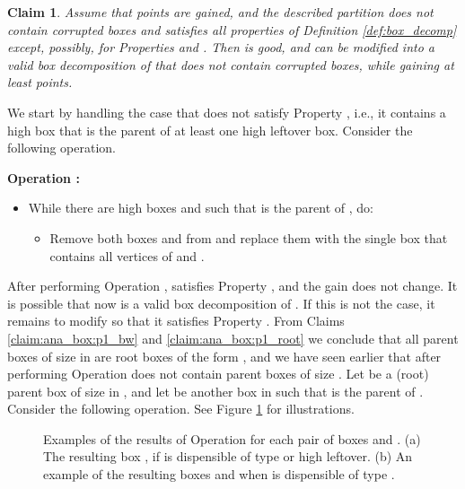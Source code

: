 \documentclass[11pt]{article}
\def\Proof{\par\noindent{\bf Proof:~}}
\def\dnsitem{\vspace{-7pt}\item}
\newtheorem{claim}[theorem]{Claim}
\theoremstyle{definition}
\begin{document}
\begin{claim}
\label{claim:ana_box:fix_p}
Assume that  points are gained, and the described partition  
does not contain corrupted boxes and satisfies all properties of Definition \ref{def:box_decomp} except, possibly, for Properties  and .
Then  is good, and  can be modified into a valid box decomposition of  that does not contain corrupted boxes, while gaining at least  points.
\end{claim}
\Proof
We start by handling the case that  does not satisfy Property , i.e., it contains a high box that is the parent of at least one high leftover box.
Consider the following operation.
\smallskip
\par\noindent
{\bf Operation :}
\begin{itemize}
\dnsitem[] While there are high boxes  and  such that  is the parent of , do:
	\begin{itemize}
		\dnsitem[] Remove both boxes  and  from  and replace them with the single box  that contains all vertices of  and .
	\end{itemize}
\end{itemize}
\bigskip
After performing Operation ,  satisfies Property , and the gain does not change.
It is possible that now  is a valid box decomposition of .
If this is not the case, it remains to modify  so that it satisfies Property .
From Claims \ref{claim:ana_box:p1_bw} and \ref{claim:ana_box:p1_root} we conclude that all parent boxes of size  in  are root boxes of the form , and we have seen earlier that after performing Operation   does not contain parent boxes of size .
Let  be a (root) parent box of size  in , and let  be another box in  such that  is the parent of .
Consider the following operation. See Figure \ref{fig:ana_box_to_graph} for illustrations.

\begin{figure}[thbp]
  \caption{\sf Examples of the results of Operation  for each pair of boxes  and .
		(a) The resulting box , if  is dispensible of type  or high leftover.
		(b) An example of the resulting boxes  and  when  is dispensible of type .}
  \medskip
  \centering
  \label{fig:ana_box_to_graph}
\end{figure}		
\end{document}

